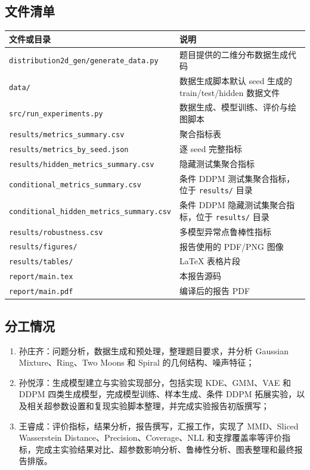 \documentclass[a4paper,11pt]{article}
\begin{document}
\subsection{文件清单}

\begin{longtable}{p{}p{}}
\toprule
文件或目录 & 说明 \\
\midrule
\texttt{distribution2d\_gen/generate\_data.py} & 题目提供的二维分布数据生成代码 \\
\texttt{data/} & 数据生成脚本默认 seed 生成的 train/test/hidden 数据文件 \\
\texttt{src/run\_experiments.py} & 数据生成、模型训练、评价与绘图脚本 \\
\texttt{results/metrics\_summary.csv} & 聚合指标表 \\
\texttt{results/metrics\_by\_seed.json} & 逐 seed 完整指标 \\
\texttt{results/hidden\_metrics\_summary.csv} & 隐藏测试集聚合指标 \\
\texttt{conditional\_metrics\_summary.csv} & 条件 DDPM 测试集聚合指标，位于 \texttt{results/} 目录 \\
\texttt{conditional\_hidden\_metrics\_summary.csv} & 条件 DDPM 隐藏测试集聚合指标，位于 \texttt{results/} 目录 \\
\texttt{results/robustness.csv} & 多模型异常点鲁棒性指标 \\
\texttt{results/figures/} & 报告使用的 PDF/PNG 图像 \\
\texttt{results/tables/} & LaTeX 表格片段 \\
\texttt{report/main.tex} & 本报告源码 \\
\texttt{report/main.pdf} & 编译后的报告 PDF \\
\bottomrule
\end{longtable}

\subsection{分工情况}

\begin{enumerate}
    \item 孙庄齐：问题分析，数据生成和预处理，整理题目要求，并分析 Gaussian Mixture、Ring、Two Moons 和 Spiral 的几何结构、噪声特征；
    \item 孙悦淳：生成模型建立与实验实现部分，包括实现 KDE、GMM、VAE 和 DDPM 四类生成模型，完成模型训练、样本生成、条件 DDPM 拓展实验，以及相关超参数设置和复现实验脚本整理，并完成实验报告初版撰写；
    \item 王睿成：评价指标，结果分析，报告撰写，汇报工作，实现了 MMD、Sliced Wasserstein Distance、Precision、Coverage、NLL 和支撑覆盖率等评价指标，完成主实验结果对比、超参数影响分析、鲁棒性分析、图表整理和最终报告排版。
\end{enumerate}
\end{document}
